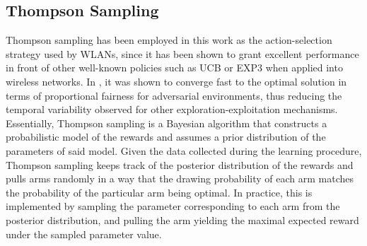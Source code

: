 \documentclass[preprint,12pt]{elsarticle}
\begin{document}
\subsection{Thompson Sampling}
\label{subsection:thompson_sampling}
Thompson sampling has been employed in this work as the action-selection strategy used by WLANs, since it has been shown to grant excellent performance in front of other well-known policies such as UCB or EXP3 when applied into wireless networks. In \cite{wilhelmi2017collaborative}, it was shown to converge fast to the optimal solution in terms of proportional fairness for adversarial environments, thus reducing the temporal variability observed for other exploration-exploitation mechanisms. Essentially, Thompson sampling \cite{thompson1933likelihood} is a Bayesian algorithm that constructs a probabilistic model of the rewards and assumes a prior distribution of the parameters of said model. Given the data collected during the learning procedure, Thompson sampling keeps track of the posterior distribution of the rewards and pulls arms randomly in a way that the drawing probability of each arm matches the probability of the particular arm being optimal. In practice, this is implemented by sampling the parameter corresponding to each arm from the posterior distribution, and pulling the arm yielding the maximal expected reward under the sampled parameter value. 
\end{document}
